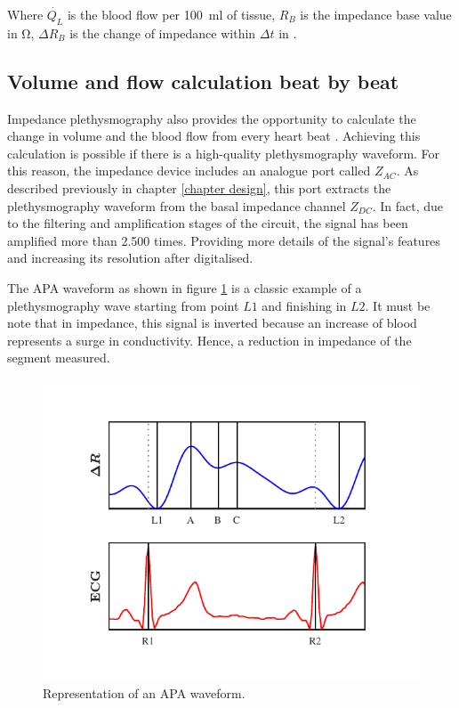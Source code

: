 
Where $\dot{Q_L}$ is the blood flow per \SI{100}{\milli\litre} of tissue, $R_B$ is the impedance base value in \si{\ohm}, $\Delta R_B$ is the change of impedance within ${\Delta t}$ in \si{\sec}.

\subsection{Volume and flow calculation beat by beat}
\label{section procedure 4.2}
Impedance plethysmography also provides the opportunity to calculate the change in volume and the blood flow from every heart beat \cite{anderson1984impedance,costeloe1980continuous,mohapatra1981non,golden1986assessment}. Achieving this calculation is possible if there is a high-quality plethysmography waveform. For this reason, the impedance device includes an analogue port called $Z_{AC}$. As described previously in chapter \ref{chapter design}, this port extracts the plethysmography waveform from the basal impedance channel $Z_{DC}$. In fact, due to the filtering and amplification stages of the circuit, the signal has been amplified more than \num{2.500} times. Providing more details of the signal's features and increasing its resolution after digitalised.

The APA waveform as shown in figure \ref{fig:markers APA} is a classic example of a plethysmography wave starting from point $L1$ and finishing in $L2$. It must be note that in impedance, this signal is inverted because an increase of blood represents a surge in conductivity. Hence, a reduction in impedance of the segment measured. 

\begin{figure}[!htpb]
	\centering
	\includegraphics[width=12cm,keepaspectratio]{figure5}
	\caption{Representation of an APA waveform.}
	\label{fig:markers APA}
\end{figure}

